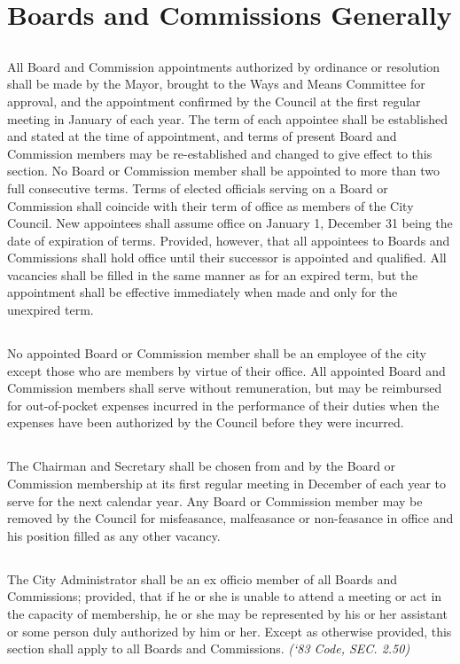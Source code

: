 \section{Boards and Commissions Generally}
\subsection{}
All Board and Commission appointments authorized by ordinance or resolution shall be made by the Mayor, brought to the Ways and Means Committee for approval, and the appointment confirmed by the Council at the first regular meeting in January of each year.  The term of each appointee shall be established and stated at the time of appointment, and terms of present Board and Commission members may be re-established and changed to give effect to this section. No Board or Commission member shall be appointed to more than two full consecutive terms. Terms of elected officials serving on a Board or Commission shall coincide with their term of office as members of the City Council. New appointees shall assume office on January 1, December 31 being the date of expiration of terms. Provided, however, that all appointees to Boards and Commissions shall hold office until their successor is appointed and qualified. All vacancies shall be filled in the same manner as for an expired term, but the appointment shall be effective immediately when made and only for the unexpired term.
\subsection{}
No appointed Board or Commission member shall be an employee of the city except those who are members by virtue of their office. All appointed Board and Commission members shall serve without remuneration, but may be reimbursed for out-of-pocket expenses incurred in the performance of their duties when the expenses have been authorized by the Council before they were incurred.
\subsection{}
The Chairman and Secretary shall be chosen from and by the Board or Commission membership at its first regular meeting in December of each year to serve for the next calendar year. Any Board or Commission member may be removed by the Council for misfeasance, malfeasance or non-feasance in office and his position filled as any other vacancy.
\subsection{}
The City Administrator shall be an ex officio member of all Boards and Commissions; provided, that if he or she is unable to attend a meeting or act in the capacity of membership, he or she may be represented by his or her assistant or some person duly authorized by him or her. Except as otherwise provided, this section shall apply to all Boards and Commissions.\newline
\emph{(‘83 Code, SEC. 2.50)}\newline

